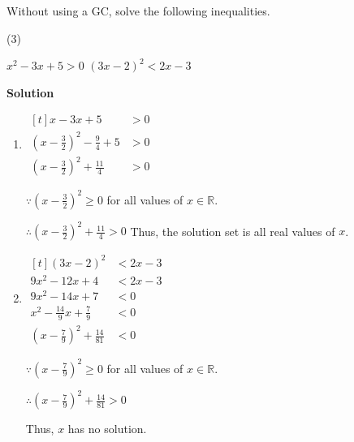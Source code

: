 \documentclass[11pt,a4paper]{book}
\newcommand{\R}{\mathbb{R}}
\begin{document}
\begin{example}{}

Without using a GC, solve the following inequalities.

\begin{tasks}[label=(\alph*),label-width=3.5ex](3)

\task $x^{2}-3x+5>0$
\task $\left(3x-2\right)^{2}<2x-3$

\end{tasks}

\textbf{Solution}

\begin{enumerate}[label=(\alph*),itemsep=1cm]

\item
$
\begin{aligned}[t]
x-3x+5 & >0\\
\left(x-\frac{3}{2}\right)^{2}-\frac{9}{4}+5 & >0\\
\left(x-\frac{3}{2}\right)^{2}+\frac{11}{4} & >0
\end{aligned}
$

${\displaystyle \because\left(x-\frac{3}{2}\right)^{2}\geq0}$ for
all values of $x\in\R$.

${\displaystyle \therefore\left(x-\frac{3}{2}\right)^{2}+\frac{11}{4}>0}$
Thus, the solution set is all real values of $x$.
\item
$
\begin{aligned}[t]
\left(3x-2\right)^{2} & <2x-3\\
9x^{2}-12x+4 & <2x-3\\
9x^{2}-14x+7 & <0\\
x^{2}-\frac{14}{9}x+\frac{7}{9} & <0\\
\left(x-\frac{7}{9}\right)^{2}+\frac{14}{81} & <0
\end{aligned}
$

${\displaystyle \because\left(x-\frac{7}{9}\right)^{2}\geq0}$ for
all values of $x\in\R$.

${\displaystyle \therefore\left(x-\frac{7}{9}\right)^{2}+\frac{14}{81}>0}$

Thus, $x$ has no solution.

\end{enumerate}
\end{example}

\newpage
\end{document}
